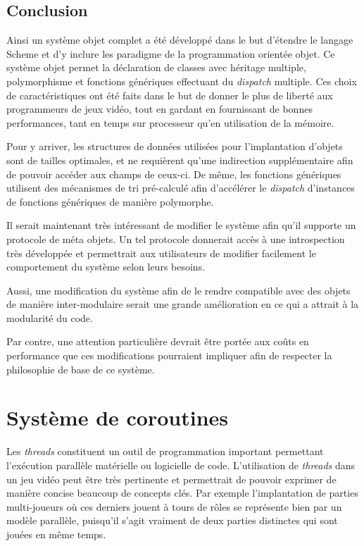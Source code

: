 \documentclass[12pt,oneside,letterpaper,francais]{book}
\begin{document}
\section{Conclusion}
Ainsi un système objet complet a été développé dans le but d'étendre
le langage Scheme et d'y inclure les paradigme de la programmation
orientée objet. Ce système objet permet la déclaration de classes avec
héritage multiple, polymorphisme et fonctions génériques effectuant du
\textit{dispatch} multiple. Ces choix de caractéristiques ont été
faits dans le but de donner le plus de liberté aux programmeurs de
jeux vidéo, tout en gardant en fournissant de bonnes performances,
tant en temps sur processeur qu'en utilisation de la mémoire.

Pour y arriver, les structures de données utilisées pour
l'implantation d'objets sont de tailles optimales, et ne requièrent
qu'une indirection supplémentaire afin de pouvoir accéder aux champs
de ceux-ci. De même, les fonctions génériques utilisent des mécanismes
de tri pré-calculé afin d'accélérer le \textit{dispatch} d'instances
de fonctions génériques de manière polymorphe.

Il serait maintenant très intéressant de modifier le système afin
qu'il supporte un protocole de méta objets. Un tel protocole donnerait
accès à une introspection très développée et permettrait aux
utilisateurs de modifier facilement le comportement du système selon
leurs besoins. 

Aussi, une modification du système afin de le rendre compatible avec
des objets de manière inter-modulaire serait une grande amélioration
en ce qui a attrait à la modularité du code. 

Par contre, une attention particulière devrait être portée aux coûts
en performance que ces modifications pourraient impliquer afin de
respecter la philosophie de base de ce système.


\chapter{Système de coroutines}
\label{Chap:corout}

Les \textit{threads} constituent un outil de programmation important
permettant l'exécution parallèle matérielle ou logicielle de
code. L'utilisation de \textit{threads} dans un jeu vidéo peut être
très pertinente et permettrait de pouvoir exprimer de manière concise
beaucoup de concepts clés. Par exemple l'implantation de parties
multi-joueurs où ces derniers jouent à tours de rôles se représente
bien par un modèle parallèle, puisqu'il s'agit vraiment de deux
parties distinctes qui sont jouées en même temps. 
\end{document}
